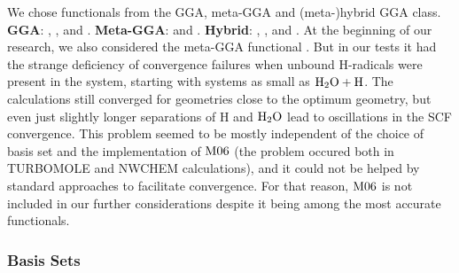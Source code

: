 \documentclass[8.5pt,twoside,twocolumn]{article}
\theoremstyle{standard}
\begin{document}
We chose functionals from the GGA, meta-GGA and \mbox{(meta-)}hybrid GGA
class.\newline
\textbf{GGA}: \bp\cite{Becke1988,Perdew1986},
\blyp\cite{Becke1988,LeeYangParr1988}, {\pbe}\cite{PerdewErnzerhofBurke1996}
and \bns\cite{GrimmeB97-D2006}.
\newline
\textbf{Meta-GGA}: \tpss\cite{TaoPerdewStaroverovEtAl2003}
and \pw\cite{ZhaoTruhlar2005}.
\newline \textbf{Hybrid}:
\btlyp\cite{Becke1993,StephensDevlinChabalowskiEtAl1994}, 
{\bhlyp}\cite{Becke1993BHLYP},
{\tpssh}\cite{TaoPerdewStaroverovEtAl2003,StaroverovScuseriaTaoEtAl2003} and
\pbez\cite{PerdewErnzerhofBurke1996,AdamoBarone1999}.
\newline
At the beginning of our research, we also considered the meta-GGA functional
\mos\cite{ZhaoTruhlar2007}. But in our tests it had the strange deficiency of
convergence failures when unbound H-radicals were present in the system,
starting with systems as small as $\text H _2 \text O + \text H$.
The calculations still converged for geometries close to the optimum geometry,
but even just slightly longer separations of H and $\text H _2 \text O$ lead to oscillations
in the SCF convergence. This problem seemed to be mostly independent of the
choice of basis set and the implementation of $\text{M06}$ (the problem occured both
in TURBOMOLE\cite{TURBOMOLE} and NWCHEM\cite{ValievBylaskaGovindEtAl2010}
calculations), and it could not be helped by standard approaches to facilitate
convergence. For that reason, $\text{M06}$ is not included in our further
considerations despite it being among the most accurate functionals.

\subsubsection{Basis Sets}
\label{Sec:Theo:Basis}
\end{document}
